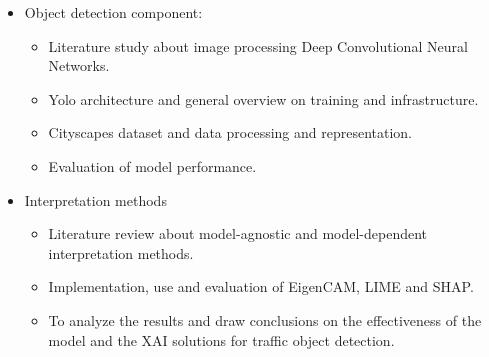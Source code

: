 \begin{itemize}
    \item Object detection component:
    \begin{itemize}
        \item Literature study about image processing Deep Convolutional Neural Networks.
        \item Yolo architecture and general overview on training and infrastructure.
        \item Cityscapes dataset and data processing and representation.
        \item Evaluation of model performance.
    \end{itemize}
    \item Interpretation methods
    \begin{itemize}
        \item Literature review about model-agnostic and model-dependent interpretation methods.
        \item Implementation, use and evaluation of EigenCAM, LIME and SHAP\@.
        \item To analyze the results and draw conclusions on the effectiveness of the model and the XAI solutions for traffic object detection.
    \end{itemize}
\end{itemize}

\newpage